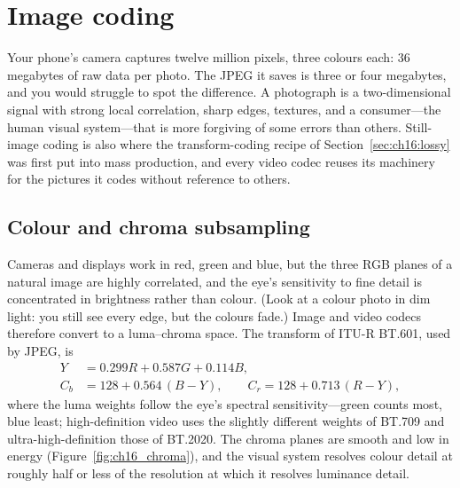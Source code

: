 \section{Image coding}
\label{sec:ch16:image}

Your phone's camera captures twelve million pixels, three colours each: 36 megabytes of raw data
per photo. The JPEG it saves is three or four megabytes, and you would struggle to spot the
difference. A photograph is a two-dimensional signal with strong local correlation, sharp edges,
textures, and a consumer---the human visual system---that is more forgiving of some errors than
others. Still-image coding is also where the transform-coding recipe of
Section~\ref{sec:ch16:lossy} was first put into mass production, and every video codec reuses its
machinery for the pictures it codes without reference to others.

\subsection{Colour and chroma subsampling}

Cameras and displays work in red, green and blue, but the three RGB planes of a natural image are
highly correlated, and the eye's sensitivity to fine detail is concentrated in brightness rather than
colour. (Look at a colour photo in dim light: you still see every edge, but the colours fade.) Image
and video codecs therefore convert to a luma--chroma space. The  transform of
ITU-R BT.601, used by JPEG, is
\begin{equation}
\begin{aligned}
Y&=0.299R+0.587G+0.114B,\\
C_b&=128+0.564\,(B-Y),\qquad C_r=128+0.713\,(R-Y),
\end{aligned}
\label{eq:ch16:ycbcr}
\end{equation}
where the luma weights follow the eye's spectral sensitivity---green counts most, blue least;
high-definition video uses the slightly different weights of BT.709 and ultra-high-definition those
of BT.2020. The chroma planes are smooth and low in energy (Figure~\ref{fig:ch16_chroma}), and the
visual system resolves colour detail at roughly half or less of the resolution at which it resolves
luminance detail.


